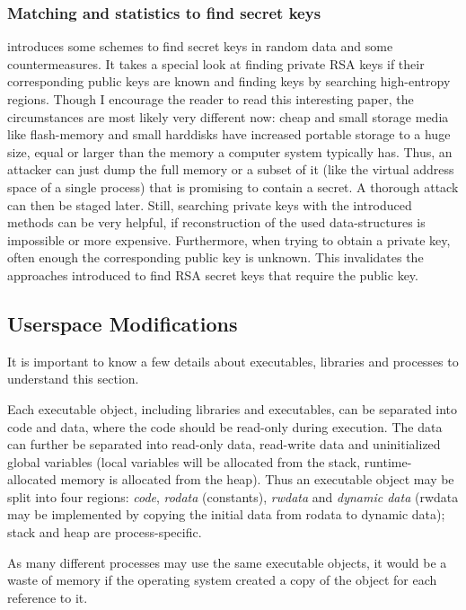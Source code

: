 \subsubsection{Matching and statistics to find secret keys}

\cite{hide_n_seek:1998} introduces some schemes to find secret keys in random
data and some countermeasures. It takes a special look at finding private RSA
keys if their corresponding public keys are known and finding keys by searching
high-entropy regions. Though I encourage the reader to read this interesting
paper, the circumstances are most likely very different now: cheap and small
storage media like flash-memory and small harddisks have increased portable
storage to a huge size, equal or larger than the memory a computer system
typically has. Thus, an attacker can just dump the full memory or a subset of it
(like the virtual address space of a single process) that is promising to
contain a secret. A thorough attack can then be staged later.  Still, searching
private keys with the introduced methods can be very helpful, if reconstruction
of the used data-structures is impossible or more expensive. Furthermore, when
trying to obtain a private key, often enough the corresponding public key is
unknown. This invalidates the approaches introduced to find RSA secret keys that
require the public key.




\subsection{Userspace Modifications}

It is important to know a few details about executables, libraries and processes
to understand this section.

Each executable object, including libraries and executables, can be separated
into code and data, where the code should be read-only during execution. The
data can further be separated into read-only data, read-write data and
uninitialized global variables (local variables will be allocated from the
stack, runtime-allocated memory is allocated from the heap).  Thus an executable
object may be split into four regions: \emph{code}, \emph{rodata} (constants),
\emph{rwdata} and \emph{dynamic data} (rwdata may be implemented by copying the
initial data from rodata to dynamic data); stack and heap are process-specific.

As many different processes may use the same executable objects, it would be a
waste of memory if the operating system created a copy of the object for each
reference to it.

